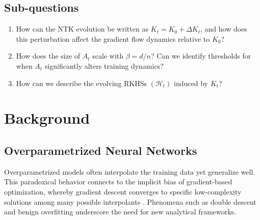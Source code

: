 \documentclass[11pt,a4paper]{article}
\begin{document}

\subsection*{Sub-questions}
\begin{enumerate}
	\item How can the NTK evolution be written as $K_t = K_0 + \Delta K_t$, and
	      how does this perturbation affect the gradient flow dynamics relative to
	      $K_0$?
	\item How does the size of $A_t$ scale with $\beta = d/n$? Can we identify
	      thresholds for when $A_t$ significantly alters training dynamics?
	\item How can we describe the evolving RKHSs $(\mathcal H_t)$ induced by
	      $K_t$?
\end{enumerate}

\section{Background}

\subsection{Overparametrized Neural Networks}
Overparametrized models often interpolate the training data yet generalize
well. This paradoxical behavior connects to the implicit bias of gradient-based
optimization, whereby gradient descent converges to specific low-complexity
solutions among many possible interpolants
\citep{soudry2024implicit,gunasekar2018implicit}. Phenomena such as double
descent and benign overfitting underscore the need for new analytical
frameworks.
\end{document}
